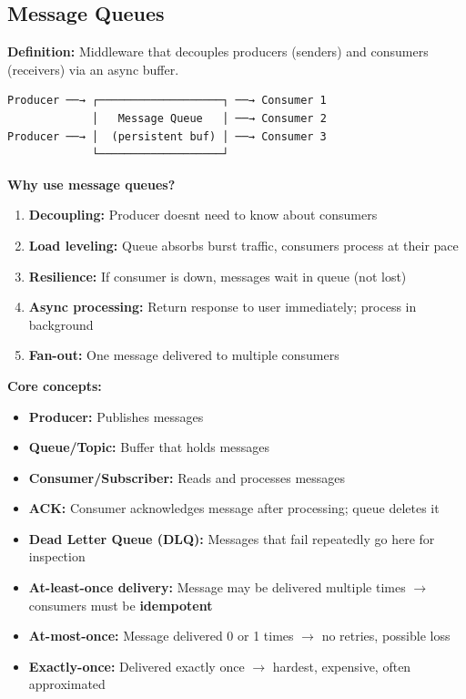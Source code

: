 \documentclass[11pt]{article}
\providecommand{\tightlist}{\setlength{\itemsep}{1pt}\setlength{\parskip}{0pt}}
\begin{document}
\subsection{Message Queues}\label{message-queues}

\textbf{Definition:} Middleware that decouples producers (senders) and consumers (receivers) via an async buffer.

\setcodelang{}

\begin{verbatim}
Producer ──→ ┌───────────────────┐ ──→ Consumer 1
             │   Message Queue   │ ──→ Consumer 2
Producer ──→ │  (persistent buf) │ ──→ Consumer 3
             └───────────────────┘
\end{verbatim}

\textbf{Why use message queues?}

\begin{enumerate}
\def\labelenumi{\arabic{enumi}.}
\tightlist
\item
  \textbf{Decoupling:} Producer doesn\textquotesingle t need to know about consumers
\item
  \textbf{Load leveling:} Queue absorbs burst traffic, consumers process at their pace
\item
  \textbf{Resilience:} If consumer is down, messages wait in queue (not lost)
\item
  \textbf{Async processing:} Return response to user immediately; process in background
\item
  \textbf{Fan-out:} One message delivered to multiple consumers
\end{enumerate}

\textbf{Core concepts:}

\begin{itemize}
\tightlist
\item
  \textbf{Producer:} Publishes messages
\item
  \textbf{Queue/Topic:} Buffer that holds messages
\item
  \textbf{Consumer/Subscriber:} Reads and processes messages
\item
  \textbf{ACK:} Consumer acknowledges message after processing; queue deletes it
\item
  \textbf{Dead Letter Queue (DLQ):} Messages that fail repeatedly go here for inspection
\item
  \textbf{At-least-once delivery:} Message may be delivered multiple times \(\rightarrow\) consumers must be \textbf{idempotent}
\item
  \textbf{At-most-once:} Message delivered 0 or 1 times \(\rightarrow\) no retries, possible loss
\item
  \textbf{Exactly-once:} Delivered exactly once \(\rightarrow\) hardest, expensive, often approximated
\end{itemize}
\end{document}
